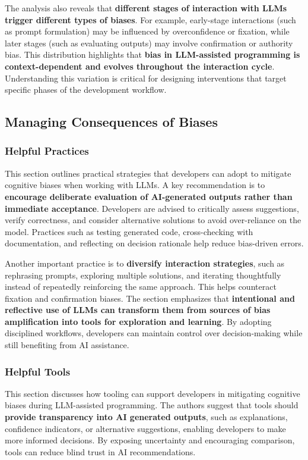 The analysis also reveals that \textbf{different stages of interaction with LLMs trigger different types of biases}. For example, early-stage interactions (such as prompt formulation) may be influenced by overconfidence or fixation, while later stages (such as evaluating outputs) may involve confirmation or authority bias. This distribution highlights that \textbf{bias in LLM-assisted programming is context-dependent and evolves throughout the interaction cycle}. Understanding this variation is critical for designing interventions that target specific phases of the development workflow.

\subsection{Managing Consequences of Biases}
\subsubsection{Helpful Practices}
This section outlines practical strategies that developers can adopt to mitigate cognitive biases when working with LLMs. A key recommendation is to \textbf{encourage deliberate evaluation of AI-generated outputs rather than immediate acceptance}. Developers are advised to critically assess suggestions, verify correctness, and consider alternative solutions to avoid over-reliance on the model. Practices such as testing generated code, cross-checking with documentation, and reflecting on decision rationale help reduce bias-driven errors.

Another important practice is to \textbf{diversify interaction strategies}, such as rephrasing prompts, exploring multiple solutions, and iterating thoughtfully instead of repeatedly reinforcing the same approach. This helps counteract fixation and confirmation biases. The section emphasizes that \textbf{intentional and reflective use of LLMs can transform them from sources of bias amplification into tools for exploration and learning}. By adopting disciplined workflows, developers can maintain control over decision-making while still benefiting from AI assistance.

\subsubsection{Helpful Tools}
This section discusses how tooling can support developers in mitigating cognitive biases during LLM-assisted programming. The authors suggest that tools should \textbf{provide transparency into AI generated outputs}, such as explanations, confidence indicators, or alternative suggestions, enabling developers to make more informed decisions. By exposing uncertainty and encouraging comparison, tools can reduce blind trust in AI recommendations.

